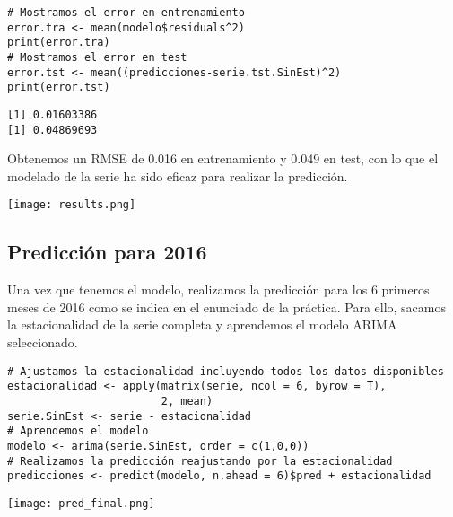 \documentclass[11pt]{article}
\begin{document}
\begin{verbatim}
# Mostramos el error en entrenamiento
error.tra <- mean(modelo$residuals^2)
print(error.tra)
# Mostramos el error en test
error.tst <- mean((predicciones-serie.tst.SinEst)^2)
print(error.tst)
\end{verbatim}

\begin{verbatim}
[1] 0.01603386
[1] 0.04869693
\end{verbatim}

Obtenemos un RMSE de 0.016 en entrenamiento y 0.049 en test, con lo
que el modelado de la serie ha sido eficaz para realizar la predicción.

\begin{center}
\texttt{[image: results.png]}
\end{center}

\subsection{Predicción para 2016}
\label{sec:org50431b9}

Una vez que tenemos el modelo, realizamos la predicción para los 6
primeros meses de 2016 como se indica en el enunciado de la
práctica. Para ello, sacamos la estacionalidad de la serie completa y
aprendemos el modelo ARIMA seleccionado. 

\begin{verbatim}
# Ajustamos la estacionalidad incluyendo todos los datos disponibles
estacionalidad <- apply(matrix(serie, ncol = 6, byrow = T),
						2, mean)
serie.SinEst <- serie - estacionalidad
# Aprendemos el modelo
modelo <- arima(serie.SinEst, order = c(1,0,0))
# Realizamos la predicción reajustando por la estacionalidad
predicciones <- predict(modelo, n.ahead = 6)$pred + estacionalidad

\end{verbatim}


\begin{center}
\texttt{[image: pred\_final.png]}
\end{center}
\end{document}
